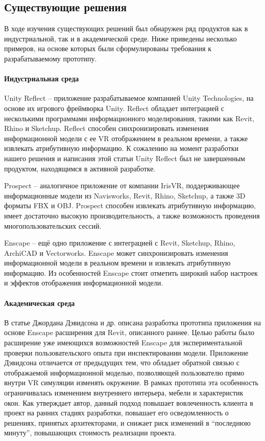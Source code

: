 ﻿\subsection{Существующие решения}
В ходе изучения существующих решений был обнаружен ряд продуктов
как в индустриальной, так и в академической среде.
Ниже приведены несколько примеров,
на основе которых были сформулированы требования к разрабатываемому прототипу.

\paragraph{Индустриальная среда}

Unity Reflect -- приложение разрабатываемое компанией Unity Technologies,
на основе их игрового фреймворка Unity.%
\cite{UnityReflect}
Reflect обладает интеграцией с несколькими программами информационного моделирования,
такими как Revit, Rhino и Sketchup.
Reflect способен синхронизировать изменения информационной модели с
ее VR отображением в реальном времени, а также извлекать атрибутивную информацию.
К сожалению на момент разработки нашего решения и написания этой статьи
Unity Reflect был не завершенным продуктом, находящимся в активной разработке.

Prospect -- аналогичное приложение от компании IrisVR,
поддерживающее информационные модели
из Navisworks, Revit, Rhino, Sketchup, а также 3D форматы FBX и OBJ.%
\cite{IrisVR}
Prospect способен извлекать атрибутивную информацию,
имеет достаточно высокую производительность,
а также возможность проведения многопользовательских сессий.

Enscape -- ещё одно приложение с интеграцией
с Revit, Sketchup, Rhino, ArchiCAD и Vectorworks.%
\cite{Enscape}
Enscape может синхронизировать изменения информационной модели в реальном времени
и извлекать атрибутивную информацию.
Из особенностей Enscape стоит отметить широкий набор
настроек и эффектов отображения информационной модели.

\paragraph{Академическая среда}

В статье Джордана Дэвидсона и др. описана разработка прототипа приложения
на основе Enscape расширения для Revit, описанного раннее.%
\cite{Davidson2019}
Целью работы было расширение уже имеющихся возможностей Enscape
для экспериментальной проверки пользовательского опыта при инспектировании модели.
Приложение Дэвидсона отличается от предыдущих тем,
что обладает обратной связью с отображаемой информационной моделью,
позволяющей пользователю прямо внутри VR симуляции изменять окружение.
В рамках прототипа эта особенность ограничивалась изменением
внутреннего интерьера, мебели и характеристик окон.
Как утверждает автор, данный подход повышает вовлеченность
клиента в проект на ранних стадиях разработки,
повышает его осведомленность о решениях, принятых архитекторами,
и снижает риск изменений в ``последнюю минуту'',
повышающих стоимость реализации проекта.

